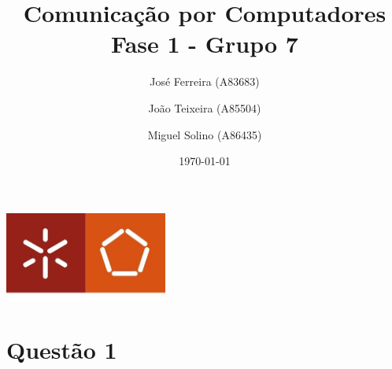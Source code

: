 \documentclass[a4paper]{report}
\begin{document}
\title{Comunicação por Computadores\\ 
\large Fase 1 - Grupo 7}
\author{José Ferreira (A83683) \and João Teixeira (A85504) \and Miguel Solino (A86435)}
\date{\today}

\begin{center}
    \begin{minipage}{0.75\linewidth}
        \centering
        \includegraphics[width=0.4\textwidth]{images/eng.jpeg}\par\vspace{1cm}
        \vspace{1.5cm}
        \href{https://www.uminho.pt/PT}
        {\color{black}{\scshape\LARGE Universidade do Minho}} \par
        \vspace{1cm}
        \href{https://www.di.uminho.pt/}
        {\color{black}{\scshape\Large Departamento de Informática}} \par
        \vspace{1.5cm}
        \maketitle
    \end{minipage}
\end{center}

\chapter{Questão 1}
\end{document}
